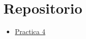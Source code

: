 \documentclass{article}
\begin{document}
%

\nocite{*}

%

\section{Repositorio}\label{sec:Repositorio}
\begin{itemize}
    \item {\color{blue}\href{https://github.com/pintovillamar/software-construction/tree/main/pract04-latex}{Practica 4}}
\end{itemize}
\end{document}
